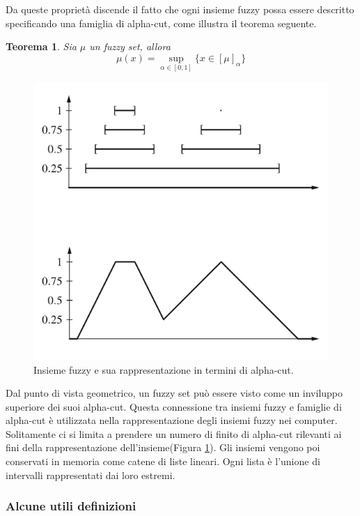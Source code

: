 \documentclass[10pt,a4paper]{article}
\newtheorem{theorem}{Teorema}
\begin{document}
Da queste proprietà discende il fatto che ogni insieme fuzzy possa essere descritto specificando una famiglia di alpha-cut, come illustra il teorema seguente.

\begin{theorem}
Sia $\mu$ un fuzzy set, allora
$$
\mu(x) = \sup_{\alpha \in [0,1]} \{x \in [\mu]_\alpha\}
$$
\end{theorem}

\begin{figure}
\centering
\includegraphics[scale=0.3]{img/alpha_cut.png}
\caption{Insieme fuzzy e sua rappresentazione in termini di alpha-cut.}
\label{fig:25}
\end{figure}

Dal punto di vista geometrico, un fuzzy set può essere visto come un inviluppo superiore dei suoi alpha-cut. Questa connessione tra insiemi fuzzy e famiglie di alpha-cut è utilizzata nella rappresentazione degli insiemi fuzzy nei computer. Solitamente ci si limita a prendere un numero di finito di alpha-cut rilevanti ai fini della rappresentazione dell'insieme(Figura \ref{fig:25}). Gli insiemi vengono poi conservati in memoria come catene di liste lineari. Ogni lista è l'unione di intervalli rappresentati dai loro estremi. 

\subsubsection{Alcune utili definizioni}
\end{document}

